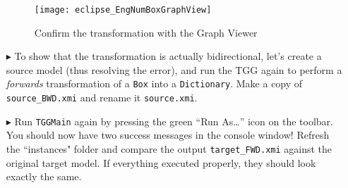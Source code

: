 \begin{itemize}
\begin{figure}[htb]
\begin{center}
  \texttt{[image: eclipse\_EngNumBoxGraphView]}
  \caption{Confirm the transformation with the Graph Viewer}
  \label{eclipse:graphView}
\end{center}
\end{figure}

\vspace{0.5cm}

\item[$\blacktriangleright$] To show that the transformation is actually bidirectional, let's create a source model (thus resolving the error), and run
the TGG again to perform a \emph{forwards} transformation of a \texttt{Box} into a \texttt{Dictionary}. Make a copy of \texttt{source\_BWD.xmi} and rename
it \texttt{source.xmi}.

\newpage

\item[$\blacktriangleright$] Run \texttt{TGGMain} again by pressing the green ``Run As\ldots'' icon on the toolbar. You should now have two success
messages in the console window! Refresh the ``instances" folder and compare the output \texttt{tar\-get\-\_FWD.xmi} against the original target model. If
everything executed properly, they should look exactly the same.

\end{itemize}

